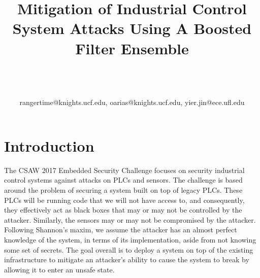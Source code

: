 \documentclass[10pt,twocolumn]{IEEEtran}
\begin{document}
\title{Mitigation of Industrial Control System Attacks Using A Boosted Filter Ensemble}

\author{\\
\\
\\
{rangertime@knights.ucf.edu, oarias@knights.ucf.edu, yier.jin@ece.ufl.edu}\vspace{-0.16in}\vspace{-0.2in}}

\maketitle
\pagestyle{empty}
\thispagestyle{empty}

\begin{abstract}

\end{abstract}

\section{Introduction}
The CSAW 2017 Embedded Security Challenge focuses on security industrial control systems against attacks on PLCs and sensors.
The challenge is based around the problem of securing a system built on top of legacy PLCs.
These PLCs will be running code that we will not have access to, and consequently, they effectively act as black boxes that may or may not be controlled by the attacker.
Similarly, the sensors may or may not be compromised by the attacker.
Following Shannon's maxim, we assume the attacker has an almost perfect knowledge of the system, in terms of its implementation, aside from not knowing some set of secrets.
The goal overall is to deploy a system on top of the existing infrastructure to mitigate an attacker's ability to cause the system to break by allowing it to enter an unsafe state.
\end{document}
